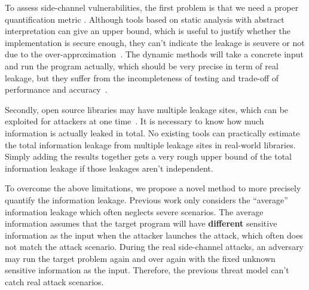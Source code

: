 To assess side-channel vulnerabilities, the first problem is that we need a proper quantification metric .
Although tools based on static analysis with abstract interpretation can give an upper bound, 
which is useful to justify whether the implementation is secure enough, 
they can’t indicate the leakage is seuvere or not due to the over-approximation~\cite{}. 
The dynamic methods will take a concrete input and run the program actually, which should be very precise in term of real leakage,
but they suffer from the incompleteness of testing and trade-off of performance and accuracy~\cite{}. 

Secondly, open source libraries may have multiple leakage sites, which can be exploited for attackers
at one time~\cite{191010,7163052,hornby2011side}. 
It is necessary to know how much information is actually leaked in total. 
No existing tools can practically estimate the total information leakage from multiple leakage sites in real-world libraries.
Simply adding the results together gets a very rough upper bound of the total information leakage if those 
leakages aren’t independent. 


To overcome the above limitations, we propose a novel method
to more precisely quantify the information leakage. Previous work only considers the
``average'' information leakage which often neglects severe scenarios.
The average information assumes that the target program will have \textbf{different} sensitive 
information as the input when the attacker launches the attack,
which often does not match the attack scenario. During the real side-channel
attacks, an adversary may run the target problem again and over again with the 
fixed unknown sensitive information as the input. Therefore, the previous
threat model can't catch real attack scenarios.

